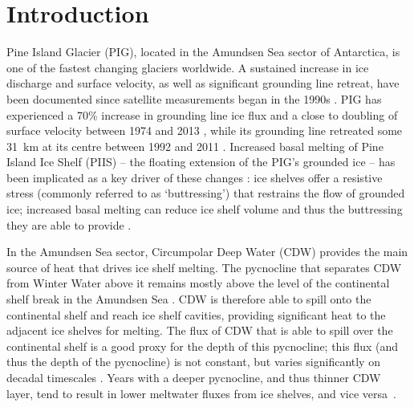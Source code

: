 \documentclass[draft]{agujournal2019}
\begin{document}
%
%
\section{Introduction}\label{S:Introduction}
Pine Island Glacier (PIG), located in the Amundsen Sea sector of Antarctica, is one of the fastest changing glaciers worldwide. A sustained increase in ice discharge and surface velocity, as well as significant grounding line retreat, have been documented since satellite measurements began in the 1990s \cite{Rignot2002AnnGlac, Rignot2008GRL, Rignot2011Science, Mouginot2014GRL, Gardner2018Cryo}. PIG has experienced a 70\% increase in grounding line ice flux and a close to doubling of surface velocity between 1974 and 2013 \cite{Mouginot2014GRL}, while its grounding line retreated some 31~km at its centre between 1992 and 2011 \cite{Rignot2014GRL}. Increased basal melting of Pine Island Ice Shelf (PIIS) -- the floating extension of the PIG's grounded ice -- has been implicated as a key driver of these changes \cite{Shepherd2004GRL, Pritchard2012Nature, Rignot2019PNAS}: ice shelves offer a resistive stress (commonly referred to as `buttressing') that restrains the flow of grounded ice; increased basal melting can reduce ice shelf volume and thus the buttressing they are able to provide \cite{Gudmundsson2013Cryo, Reese2018NatureClimCh, Gudmundsson2019GRL,Gagliardini2010GRL,Goldberg2019GRL, DeRydt2021Cryosphere}.

In the Amundsen Sea sector, Circumpolar Deep Water (CDW) provides the main source of heat that drives ice shelf melting. The pycnocline that separates CDW from Winter Water above it remains mostly above the level of the continental shelf break in the Amundsen Sea \cite{Jacobs2015Oceanography, Heywood2016Oceanography}. CDW is therefore able to spill onto the continental shelf and reach ice shelf cavities, providing significant heat to the adjacent ice shelves for melting. The flux of CDW that is able to spill over the continental shelf is a good proxy for the depth of this pycnocline; this flux (and thus the depth of the pycnocline) is not constant, but varies significantly on decadal timescales \cite{Jenkins2018NatureGeo}. Years with a deeper pycnocline, and thus thinner CDW layer, tend to result in lower meltwater fluxes from ice shelves, and vice versa~\cite{Jacobs2011NatureGeosci,Dutrieux2014Science}.
\end{document}
